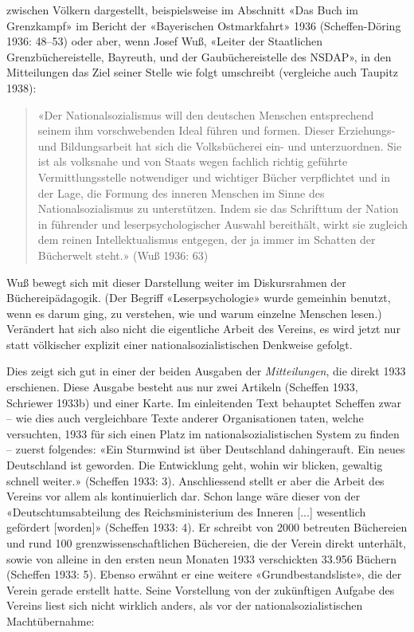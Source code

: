 \documentclass[a4paper,
fontsize=11pt,
oneside,
numbers=noperiodatend,
parskip=half-,
bibliography=totoc,
final
]{scrartcl}
\begin{document}
zwischen Völkern dargestellt, beispielsweise im Abschnitt «Das Buch im
Grenzkampf» im Bericht der «Bayerischen Ostmarkfahrt» 1936
(Scheffen-Döring 1936: 48--53) oder aber, wenn Josef Wuß, «Leiter der
Staatlichen Grenzbüchereistelle, Bayreuth, und der Gaubüchereistelle des
NSDAP», in den Mitteilungen das Ziel seiner Stelle wie folgt umschreibt
(vergleiche auch Taupitz 1938):

\begin{quote}
«Der Nationalsozialismus will den deutschen Menschen entsprechend seinem
ihm vorschwebenden Ideal führen und formen. Dieser Erziehungs- und
Bildungsarbeit hat sich die Volksbücherei ein- und unterzuordnen. Sie
ist als volksnahe und von Staats wegen fachlich richtig geführte
Vermittlungsstelle notwendiger und wichtiger Bücher verpflichtet und in
der Lage, die Formung des inneren Menschen im Sinne des
Nationalsozialismus zu unterstützen. Indem sie das Schrifttum der Nation
in führender und leserpsychologischer Auswahl bereithält, wirkt sie
zugleich dem reinen Intellektualismus entgegen, der ja immer im Schatten
der Bücherwelt steht.» (Wuß 1936: 63)
\end{quote}

Wuß bewegt sich mit dieser Darstellung weiter im Diskursrahmen der
Büchereipädagogik. (Der Begriff «Leserpsychologie» wurde gemeinhin
benutzt, wenn es darum ging, zu verstehen, wie und warum einzelne
Menschen lesen.) Verändert hat sich also nicht die eigentliche Arbeit
des Vereins, es wird jetzt nur statt völkischer explizit einer
nationalsozialistischen Denkweise gefolgt.

Dies zeigt sich gut in einer der beiden Ausgaben der
\emph{Mitteilungen}, die direkt 1933 erschienen. Diese Ausgabe besteht
aus nur zwei Artikeln (Scheffen 1933, Schriewer 1933b) und einer Karte.
Im einleitenden Text behauptet Scheffen zwar -- wie dies auch
vergleichbare Texte anderer Organisationen taten, welche versuchten,
1933 für sich einen Platz im nationalsozialistischen System zu finden --
zuerst folgendes: «Ein Sturmwind ist über Deutschland dahingerauft. Ein
neues Deutschland ist geworden. Die Entwicklung geht, wohin wir blicken,
gewaltig schnell weiter.» (Scheffen 1933: 3). Anschliessend stellt er
aber die Arbeit des Vereins vor allem als kontinuierlich dar. Schon
lange wäre dieser von der «Deutschtumsabteilung des Reichsministerium
des Inneren {[}...{]} wesentlich gefördert {[}worden{]}» (Scheffen 1933:
4). Er schreibt von 2000 betreuten Büchereien und rund 100
grenzwissenschaftlichen Büchereien, die der Verein direkt unterhält,
sowie von alleine in den ersten neun Monaten 1933 verschickten 33.956
Büchern (Scheffen 1933: 5). Ebenso erwähnt er eine weitere
«Grundbestandsliste», die der Verein gerade erstellt hatte. Seine
Vorstellung von der zukünftigen Aufgabe des Vereins liest sich nicht
wirklich anders, als vor der nationalsozialistischen Machtübernahme:
\end{document}
